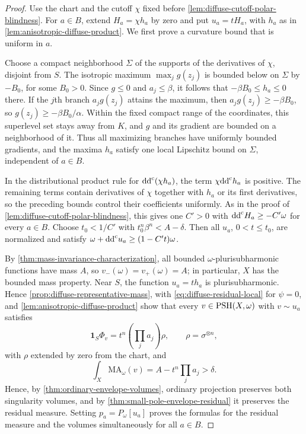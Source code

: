 \begin{proof}
Use the chart and the cutoff $\chi$ fixed before \cref{lem:diffuse-cutoff-polar-blindness}. For $a\in B$, extend $H_a=\chi h_a$ by zero and put $u_a=tH_a$, with $h_a$ as in \cref{lem:anisotropic-diffuse-product}. We first prove a curvature bound that is uniform in $a$.

Choose a compact neighborhood $\Sigma$ of the supports of the derivatives of $\chi$, disjoint from $S$. The isotropic maximum $\max_j g(z_j)$ is bounded below on $\Sigma$ by $-B_0$, for some $B_0>0$. Since $g\leq0$ and $a_j\leq\beta$, it follows that $-\beta B_0\leq h_a\leq0$ there. If the $j$th branch $a_jg(z_j)$ attains the maximum, then $a_jg(z_j)\geq-\beta B_0$, so $g(z_j)\geq-\beta B_0/\alpha$. Within the fixed compact range of the coordinates, this superlevel set stays away from $K$, and $g$ and its gradient are bounded on a neighborhood of it. Thus all maximizing branches have uniformly bounded gradients, and the maxima $h_a$ satisfy one local Lipschitz bound on $\Sigma$, independent of $a\in B$.

In the distributional product rule for $\mathrm{dd}^{\mathrm{c}}(\chi h_a)$, the term $\chi\mathrm{dd}^{\mathrm{c}} h_a$ is positive. The remaining terms contain derivatives of $\chi$ together with $h_a$ or its first derivatives, so the preceding bounds control their coefficients uniformly. As in the proof of \cref{lem:diffuse-cutoff-polar-blindness}, this gives one $C'>0$ with $\mathrm{dd}^{\mathrm{c}} H_a\geq-C'\omega$ for every $a\in B$. Choose $t_0<1/C'$ with $t_0^n\beta^n<A-\delta$. Then all $u_a$, $0<t\leq t_0$, are normalized and satisfy $\omega+\mathrm{dd}^{\mathrm{c}} u_a\geq(1-C't)\omega$.

By \cref{thm:mass-invariance-characterization}, all bounded $\omega$-plurisubharmonic functions have mass $A$, so $v_-(\omega)=v_+(\omega)=A$; in particular, $X$ has the bounded mass property. Near $S$, the function $u_a=th_a$ is plurisubharmonic. Hence \cref{prop:diffuse-representative-mass}, with \eqref{eq:diffuse-residual-local} for $\psi=0$, and \cref{lem:anisotropic-diffuse-product} show that every $v\in\mathrm{PSH}(X,\omega)$ with $v\sim u_a$ satisfies
\[
 \mathbf1_S\Phi_v=t^n\left(\prod_j a_j\right)\rho,\qquad \rho=\sigma^{\otimes n},
\]
with $\rho$ extended by zero from the chart, and
\[
 \int_X\mathrm{MA}_\omega(v)=A-t^n\prod_j a_j>\delta.
\]
Hence, by \cref{thm:ordinary-envelope-volumes}, ordinary projection preserves both singularity volumes, and by \cref{thm:small-pole-envelope-residual} it preserves the residual measure. Setting $p_a=P_\omega[u_a]$ proves the formulas for the residual measure and the volumes simultaneously for all $a\in B$.


\end{proof}
